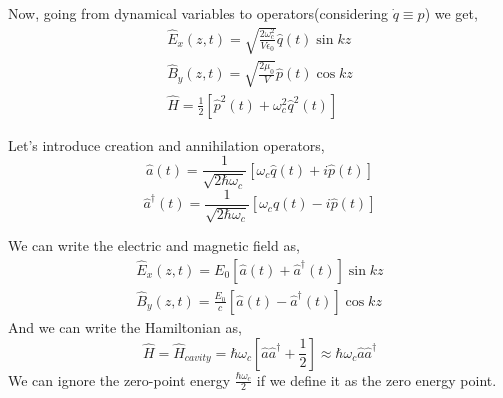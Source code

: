 \documentclass{article}
\numberwithin{equation}{section} %
\begin{document}
Now, going from dynamical variables to operators(considering $\dot{q} \equiv p$) we get,
\begin{equation}
    \begin{split}
         \hat{E}_x(z, t) = \sqrt{\frac{2 \omega_c^2}{V \epsilon_0}}\hat{q}(t)\sin{kz} \\
         \hat{B}_y(z, t) = \sqrt{\frac{2 \mu_0}{V}}\hat{p}(t)\cos{kz} \\
         \hat{H} = \frac{1}{2}[\hat{p}^2(t) + \omega_c^2 \hat{q}^2(t)]
    \end{split}
\end{equation}

Let’s introduce creation and annihilation operators,
$$\hat{a}(t) = \frac{1}{\sqrt{2\hbar\omega_c}}[\omega_c\hat{q}(t) + i\hat{p}(t)]$$
$$\hat{a}^\dag(t) = \frac{1}{\sqrt{2\hbar\omega_c}}[\omega_c\hat{q}(t) - i\hat{p}(t)]$$

We can write the electric and magnetic field as,
\begin{equation}
    \begin{split}
         \hat{E}_x(z, t) = E_0[\hat{a}(t) + \hat{a}^\dag(t)]\sin{kz} \\
         \hat{B}_y(z, t) = \frac{E_0}{c}[\hat{a}(t) - \hat{a}^\dag(t)]\cos{kz}
    \end{split}
\end{equation}
And we can write the Hamiltonian as,
\begin{equation}
    \hat{H} = \hat{H}_{cavity} = \hbar\omega_c[\hat{a}\hat{a}^\dag + \frac{1}{2}] \approx \hbar\omega_c\hat{a}\hat{a}^\dag
\end{equation}
We can ignore the zero-point energy $\frac{\hbar\omega_c}{2}$ if we define it as the zero energy point.
\end{document}
